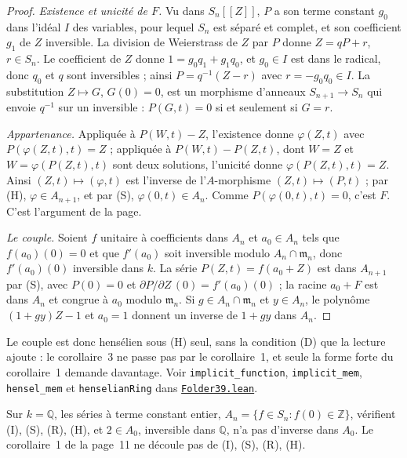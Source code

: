 \begin{proof}
\emph{Existence et unicité de $F$.} Vu dans $S_n[[Z]]$, $P$ a son terme constant $g_0$ dans l'idéal $I$ des variables, pour lequel $S_n$ est séparé et complet, et son coefficient $g_1$ de $Z$ inversible. La division de Weierstrass de $Z$ par $P$ donne $Z = qP + r$, $r \in S_n$. Le coefficient de $Z$ donne $1 = g_0 q_1 + g_1 q_0$, et $g_0 \in I$ est dans le radical, donc $q_0$ et $q$ sont inversibles ; ainsi $P = q^{-1}(Z - r)$ avec $r = -g_0 q_0 \in I$. La substitution $Z \mapsto G$, $G(0) = 0$, est un morphisme d'anneaux $S_{n+1} \to S_n$ qui envoie $q^{-1}$ sur un inversible : $P(G, t) = 0$ si et seulement si $G = r$.

\emph{Appartenance.} Appliquée à $P(W, t) - Z$, l'existence donne $\varphi(Z, t)$ avec $P(\varphi(Z, t), t) = Z$ ; appliquée à $P(W, t) - P(Z, t)$, dont $W = Z$ et $W = \varphi(P(Z, t), t)$ sont deux solutions, l'unicité donne $\varphi(P(Z, t), t) = Z$. Ainsi $(Z, t) \mapsto (\varphi, t)$ est l'inverse de l'$A$-morphisme $(Z, t) \mapsto (P, t)$ ; par (H), $\varphi \in A_{n+1}$, et par (S), $\varphi(0, t) \in A_n$. Comme $P(\varphi(0, t), t) = 0$, c'est $F$. C'est l'argument de la page.

\emph{Le couple.} Soient $f$ unitaire à coefficients dans $A_n$ et $a_0 \in A_n$ tels que $f(a_0)(0) = 0$ et que $f'(a_0)$ soit inversible modulo $A_n \cap \mathfrak m_n$, donc $f'(a_0)(0)$ inversible dans $k$. La série $P(Z, t) = f(a_0 + Z)$ est dans $A_{n+1}$ par (S), avec $P(0) = 0$ et $\partial P/\partial Z\,(0) = f'(a_0)(0)$ ; la racine $a_0 + F$ est dans $A_n$ et congrue à $a_0$ modulo $\mathfrak m_n$. Si $g \in A_n \cap \mathfrak m_n$ et $y \in A_n$, le polynôme $(1 + gy)Z - 1$ et $a_0 = 1$ donnent un inverse de $1 + gy$ dans $A_n$.
\end{proof}

\noindent Le couple est donc hensélien sous (H) seul, sans la condition (D) que la lecture ajoute : le corollaire~3 ne passe pas par le corollaire~1, et seule la forme forte du corollaire~1 demande davantage. Voir \texttt{implicit\_function}, \texttt{implicit\_mem}, \texttt{hensel\_mem} et \texttt{henselianRing} dans \href{\leanblob/RingTheory/Folder39.lean}{\texttt{Folder39.\allowbreak{}lean}}.

\begin{encadre}
\begin{contrexemple}\label{cex:39}
Sur $k = \mathbb Q$, les séries à terme constant entier, $A_n = \{ f \in S_n : f(0) \in \mathbb Z \}$, vérifient (I), (S), (R), (H), et $2 \in A_0$, inversible dans $\mathbb Q$, n'a pas d'inverse dans $A_0$. Le corollaire~1 de la page~11 ne découle pas de (I), (S), (R), (H).
\end{contrexemple}
\end{encadre}

